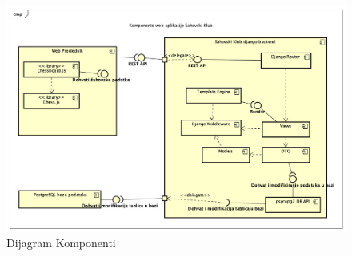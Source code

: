 			 \begin{figure}[H]
					\centerfloat
					\advance{}
        					\includegraphics[scale=0.55]{dijagrami/dijagramKomponenti.png} %
        					\caption{Dijagram Komponenti}
        					\label{fig:dijagramKomponenti}
				\end{figure}